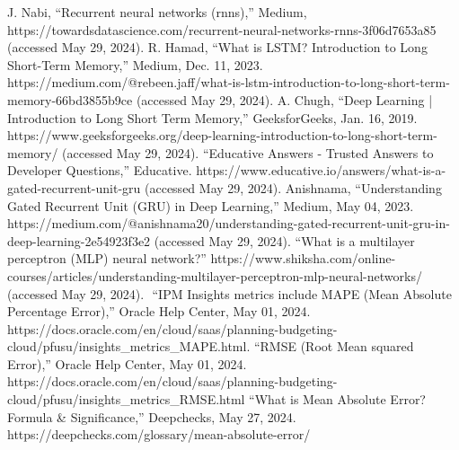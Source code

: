 \documentclass{ieeeojies}
\begin{document}
\begin{thebibliography}{00}
		 J. Nabi, “Recurrent neural networks (rnns),” Medium, https://towardsdatascience.com/recurrent-neural-networks-rnns-3f06d7653a85 (accessed May 29, 2024). 
		 R. Hamad, “What is LSTM? Introduction to Long Short-Term Memory,” Medium, Dec. 11, 2023. https://medium.com/@rebeen.jaff/what-is-lstm-introduction-to-long-short-term-memory-66bd3855b9ce (accessed May 29, 2024).
		 A. Chugh, “Deep Learning | Introduction to Long Short Term Memory,” GeeksforGeeks, Jan. 16, 2019. https://www.geeksforgeeks.org/deep-learning-introduction-to-long-short-term-memory/ (accessed May 29, 2024).
		 “Educative Answers - Trusted Answers to Developer Questions,” Educative. https://www.educative.io/answers/what-is-a-gated-recurrent-unit-gru (accessed May 29, 2024).
		 Anishnama, “Understanding Gated Recurrent Unit (GRU) in Deep Learning,” Medium, May 04, 2023. https://medium.com/@anishnama20/understanding-gated-recurrent-unit-gru-in-deep-learning-2e54923f3e2 (accessed May 29, 2024).
		 “What is a multilayer perceptron (MLP) neural network?” https://www.shiksha.com/online-courses/articles/understanding-multilayer-perceptron-mlp-neural-networks/ (accessed May 29, 2024).
		‌ “IPM Insights metrics include MAPE (Mean Absolute Percentage Error),” Oracle Help Center, May 01, 2024. https://docs.oracle.com/en/cloud/saas/planning-budgeting-cloud/pfusu/insights\_metrics\_MAPE.html. 
		 “RMSE (Root Mean squared Error),” Oracle Help Center, May 01, 2024. https://docs.oracle.com/en/cloud/saas/planning-budgeting-cloud/pfusu/insights\_metrics\_RMSE.html
		 “What is Mean Absolute Error? Formula \& Significance,” Deepchecks, May 27, 2024. https://deepchecks.com/glossary/mean-absolute-error/
		
		
	\end{thebibliography}
	
	\EOD
	
\end{document}
